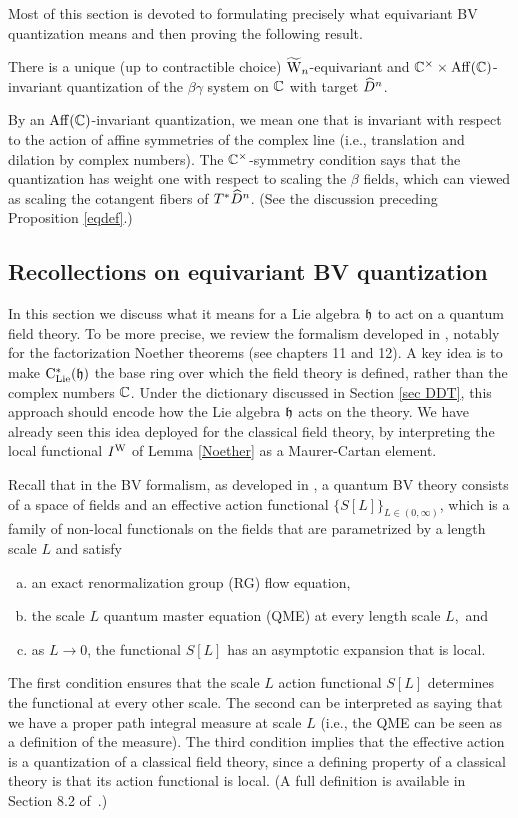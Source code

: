 Most of this section is devoted to formulating precisely what equivariant BV quantization means and then proving the following result.

\begin{thm} \label{bvq} 
There is a unique (up to contractible choice) $\widetilde{{{\rm W}}}_n$-equivariant and $\mathbb C^\times \times {\rm Aff}(\mathbb C)$-invariant quantization 
of the $\beta\gamma$ system on $\mathbb C$ with target $\widehat{D}^n$.
\end{thm}

By an ${\rm Aff}(\mathbb C)$-invariant quantization, we mean one that is invariant with respect to the action of affine symmetries of the complex line (i.e., translation and dilation by complex numbers). 
The $\mathbb C^\times$-symmetry condition says that the quantization has weight one with respect to scaling the $\beta$ fields, which can viewed as scaling the cotangent fibers of $T^*\widehat{D}^n$.
(See the discussion preceding Proposition \ref{eqdef}.)

\subsection{Recollections on equivariant BV quantization} \label{sec equiv bv 1}

In this section we discuss what it means for a Lie algebra $\mathfrak h$ to act on a quantum field theory.
To be more precise, we review the formalism developed in \cite{CG2}, notably for the factorization Noether theorems  (see chapters 11 and 12).
A key idea is to make ${\rm C}_{\rm Lie}^*(\mathfrak h)$ the base ring over which the field theory is defined, rather than the complex numbers $\mathbb C$.
Under the dictionary discussed in Section \ref{sec DDT}, this approach should encode how the Lie algebra $\mathfrak h$ acts on the theory.
We have already seen this idea deployed for the classical field theory, 
by interpreting the local functional $I^{\rm W}$ of Lemma \ref{Noether} as a Maurer-Cartan element.

Recall that in the BV formalism, as developed in \cite{CosBook,CG2}, 
a quantum BV theory consists of a space of fields and an effective action functional $\{S[L]\}_{L \in (0,\infty)}$,
which is a family of non-local functionals on the fields that are parametrized by a length scale $L$ 
and satisfy
\begin{enumerate}[(a)]
\item an exact renormalization group (RG) flow equation,
\item the scale $L$ quantum master equation (QME) at every length scale $L$,~and
\item as $L \to 0$, the functional $S[L]$ has an asymptotic expansion that is local.
\end{enumerate}
The first condition ensures that the scale $L$ action functional $S[L]$ determines the functional at every other scale.
The second can be interpreted as saying that we have a proper path integral measure at scale $L$ 
(i.e., the QME can be seen as a definition of the measure).
The third condition implies that the effective action is a quantization of a classical field theory,
since a defining property of a classical theory is that its action functional is local.
(A full definition is available in Section 8.2 of~\cite{CG2}.)

